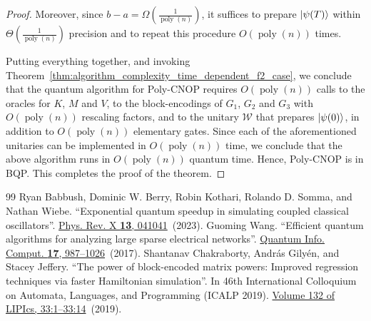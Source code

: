 \documentclass[10pt,a4paper]{amsart}
\theoremstyle{plain}
\theoremstyle{definition}
\theoremstyle{remark}
\newcommand{\lrb}[1]{\left ( #1 \right )}
\newcommand{\mypoly}[1]{\operatorname{poly} \lrb{#1}}
\newcommand{\myO}[1]{O\lrb{#1}}
\newcommand{\myOmega}[1]{\Omega\lrb{#1}}
\newcommand{\myTheta}[1]{\Theta\lrb{#1}}
\begin{document}
\begin{proof}
Moreover, since $b-a=\myOmega{\frac{1}{\mypoly{n}}}$, it suffices to prepare $\ket{\psi(T)}$ within $\myTheta{\frac{1}{\mypoly{n}}}$ precision and to repeat this procedure $\myO{\mypoly{n}}$ times. 

Putting everything together, and invoking Theorem~\ref{thm:algorithm_complexity_time_dependent_f2_case}, we conclude that the quantum algorithm for Poly-CNOP requires $\myO{\mypoly{n}}$ calls to the oracles for $K$, $M$ and $V$, to the block-encodings of $G_1$, $G_2$ and $G_3$ with $\myO{\mypoly{n}}$ rescaling factors, and to the unitary $\mathcal{W}$ that prepares $\ket{\psi(0)}$, in addition to $\myO{\mypoly{n}}$ elementary gates. Since each of the aforementioned unitaries can be implemented in $\myO{\mypoly{n}}$ time, we conclude that the above algorithm runs in $\myO{\mypoly{n}}$ quantum time. Hence, Poly-CNOP is in BQP. This completes the proof of the theorem.
\end{proof}

\begin{thebibliography}{99}
 Ryan Babbush, Dominic W. Berry, Robin Kothari, Rolando D. Somma, and Nathan Wiebe. ``Exponential quantum speedup in simulating coupled classical oscillators''. \href{https://dx.doi.org/10.1103/PhysRevX.13.041041}{Phys. Rev. X {\bf 13}, 041041}~(2023).
 Guoming Wang. ``Efficient quantum algorithms for analyzing large sparse electrical networks''. \href{https://dx.doi.org/10.26421/QIC17.11-12-5}{Quantum Info. Comput. {\bf 17}, 987--1026}~(2017).
 Shantanav Chakraborty, Andr\'{a}s Gily\'{e}n, and Stacey Jeffery. ``The power of block-encoded matrix powers: Improved regression techniques via faster {H}amiltonian simulation''. In 46th International Colloquium on Automata, Languages, and Programming (ICALP 2019). \href{https://dx.doi.org/10.4230/LIPIcs.ICALP.2019.33}{Volume 132 of LIPIcs, 33:1--33:14}~(2019).
\end{thebibliography}
\end{document}
